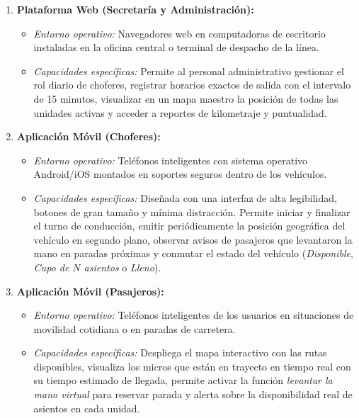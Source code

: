 \begin{enumerate}
    \item \textbf{Plataforma Web (Secretaría y Administración):}
    \begin{itemize}
        \item \emph{Entorno operativo:} Navegadores web en computadoras de escritorio instaladas en la oficina central o terminal de despacho de la línea.
        \item \emph{Capacidades específicas:} Permite al personal administrativo gestionar el rol diario de choferes, registrar horarios exactos de salida con el intervalo de 15 minutos, visualizar en un mapa maestro la posición de todas las unidades activas y acceder a reportes de kilometraje y puntualidad.
    \end{itemize}

    \item \textbf{Aplicación Móvil (Choferes):}
    \begin{itemize}
        \item \emph{Entorno operativo:} Teléfonos inteligentes con sistema operativo Android/iOS montados en soportes seguros dentro de los vehículos.
        \item \emph{Capacidades específicas:} Diseñada con una interfaz de alta legibilidad, botones de gran tamaño y mínima distracción. Permite iniciar y finalizar el turno de conducción, emitir periódicamente la posición geográfica del vehículo en segundo plano, observar avisos de pasajeros que levantaron la mano en paradas próximas y conmutar el estado del vehículo (\emph{Disponible}, \emph{Cupo de $N$ asientos} o \emph{Lleno}).
    \end{itemize}

    \item \textbf{Aplicación Móvil (Pasajeros):}
    \begin{itemize}
        \item \emph{Entorno operativo:} Teléfonos inteligentes de los usuarios en situaciones de movilidad cotidiana o en paradas de carretera.
        \item \emph{Capacidades específicas:} Despliega el mapa interactivo con las rutas disponibles, visualiza los micros que están en trayecto en tiempo real con su tiempo estimado de llegada, permite activar la función \emph{levantar la mano virtual} para reservar parada y alerta sobre la disponibilidad real de asientos en cada unidad.
    \end{itemize}
\end{enumerate}

